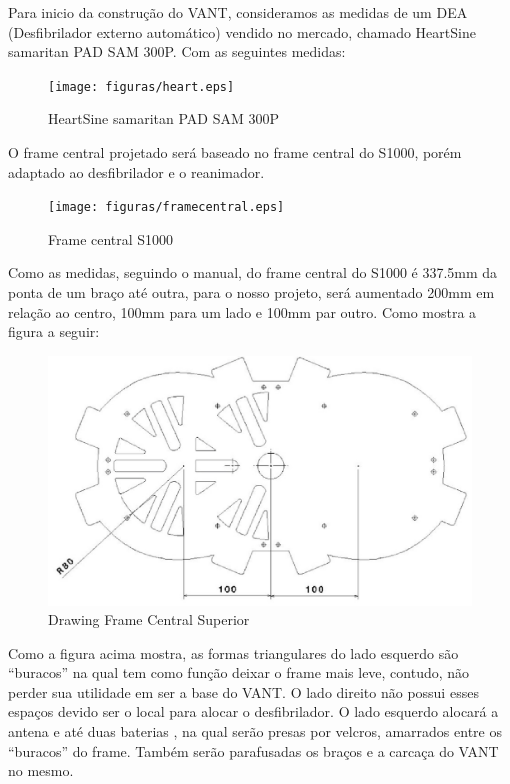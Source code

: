 Para inicio da construção do VANT, consideramos as medidas de um DEA (Desfibrilador externo automático) vendido no mercado, chamado HeartSine samaritan PAD SAM 300P. Com as seguintes  medidas:

\begin{figure}[H]
    \centering
      \texttt{[image: figuras/heart.eps]}
    \caption{ HeartSine samaritan PAD SAM 300P}
    \label{fig:heart}
\end{figure}

O frame central projetado será baseado no frame central do S1000, porém adaptado ao desfibrilador e o reanimador. 

\begin{figure}[H]
    \centering
      \texttt{[image: figuras/framecentral.eps]}
    \caption{ Frame central S1000}
    \label{fig:framecentral}
\end{figure}


Como as medidas, seguindo o manual, do frame central do S1000 é 337.5mm da ponta de um braço até outra, para o nosso projeto, será aumentado  200mm em relação ao centro, 100mm para um lado e 100mm par outro. Como mostra a figura a seguir:

\begin{figure}[H]
    \centering
      \includegraphics[keepaspectratio=true,scale=0.5]{figuras/drawing.eps}
    \caption{ Drawing Frame Central Superior}
    \label{fig:drawing}
\end{figure}

Como a figura acima mostra, as formas triangulares do lado esquerdo são “buracos” na qual tem como função deixar o frame mais leve, contudo, não perder sua utilidade em ser a base do VANT. O lado direito não possui esses espaços devido ser o local para alocar o desfibrilador. O lado esquerdo alocará a antena e até duas baterias , na qual serão presas por velcros, amarrados entre os “buracos” do frame. Também serão parafusadas os braços e a carcaça do VANT no mesmo.

